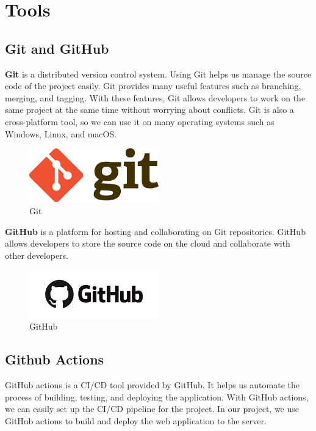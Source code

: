 \section{Tools}

\subsection{Git and GitHub}
\textbf{Git} is a distributed version control system. Using Git helps us manage the source code of the project easily. Git provides many useful features such as branching, merging, and tagging. With these features, Git allows developers to work on the same project at the same time without worrying about conflicts. Git is also a cross-platform tool, so we can use it on many operating systems such as Windows, Linux, and macOS.

\begin{figure}[ht]
    \centering
    \includegraphics[width=0.5\textwidth]{../Images/8.Technology_Stack/git_logo.png}
    \caption{Git}
    \label{fig:git}
\end{figure}

\noindent \textbf{GitHub} is a platform for hosting and collaborating on Git repositories. GitHub allows developers to store the source code on the cloud and collaborate with other developers.

\begin{figure}
    \centering
    \includegraphics[width=0.5\textwidth]{../Images/8.Technology_Stack/github_logo.png}
    \caption{GitHub}
    \label{fig:github}
\end{figure}

\subsection{Github Actions}
GitHub actions is a CI/CD tool provided by GitHub. It helps us automate the process of building, testing, and deploying the application. With GitHub actions, we can easily set up the CI/CD pipeline for the project. In our project, we use GitHub actions to build and deploy the web application to the server.

